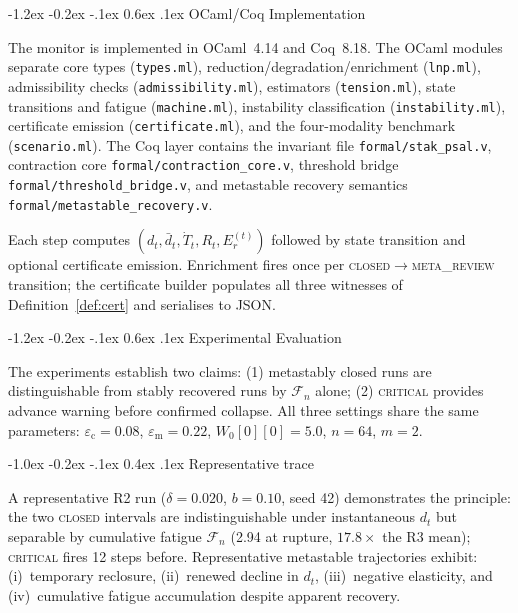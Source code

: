 \documentclass{llncs}
\makeatletter
\renewcommand\section{\@startsection{section}{1}{\z@}%
  {-1.2ex \@plus -0.2ex \@minus -.1ex}%
  {0.6ex \@plus .1ex}%
  {\normalfont\large\bfseries}}
\renewcommand\subsection{\@startsection{subsection}{2}{\z@}%
  {-1.0ex \@plus -0.2ex \@minus -.1ex}%
  {0.4ex \@plus .1ex}%
  {\normalfont\normalsize\bfseries}}
\newcommand{\ecollapse}{\varepsilon_{\mathrm{c}}}
\newcommand{\emeta}{\varepsilon_{\mathrm{m}}}
\newcommand{\st}[1]{\textup{\textsc{#1}}}
\makeatother
\begin{document}
\section{OCaml/Coq Implementation}
\label{sec:impl}

{\sloppy
The monitor is implemented in OCaml~4.14 and Coq~8.18. The OCaml modules separate
core types (\texttt{types.ml}), reduction/degradation/enrichment
(\texttt{lnp.ml}), admissibility checks (\texttt{admissibility.ml}),
estimators (\texttt{tension.ml}), state transitions and fatigue
(\texttt{machine.ml}), instability classification
(\texttt{instability.ml}), certificate emission (\texttt{certificate.ml}),
and the four-modality benchmark (\texttt{scenario.ml}). The Coq layer
contains the invariant file \texttt{formal/stak\_psal.v}, contraction
core \texttt{formal/contraction\_core.v}, threshold bridge
\texttt{formal/threshold\_bridge.v}, and metastable recovery semantics
\texttt{formal/metastable\_recovery.v}.\par}

Each step computes $(d_t,\bar{d}_t,\dot{T}_t,R_t,E_r^{(t)})$ followed
by state transition and optional certificate emission. Enrichment fires
once per \st{closed}$\to$\st{meta\_review} transition; the certificate
builder populates all three witnesses of Definition~\ref{def:cert} and
serialises to JSON.

\section{Experimental Evaluation}
\label{sec:experiments}

The experiments establish two claims: (1) metastably closed runs are
distinguishable from stably recovered runs by $\mathcal{F}_n$ alone;
(2) \st{critical} provides advance warning before confirmed collapse.
All three settings share the same parameters:
$\ecollapse = 0.08$, $\emeta = 0.22$, $W_0[0][0] = 5.0$, $n = 64$,
$m = 2$.

\subsection{Representative trace}
\label{sec:trace}

A representative R2 run ($\delta = 0.020$, $b = 0.10$, seed 42)
demonstrates the principle: the two \st{closed} intervals are
indistinguishable under instantaneous $d_t$ but separable by cumulative
fatigue $\mathcal{F}_n$ (2.94 at rupture, $17.8\times$ the R3 mean);
\st{critical} fires 12 steps before. Representative metastable trajectories exhibit:
(i)~temporary reclosure, (ii)~renewed decline in $d_t$,
(iii)~negative elasticity, and (iv)~cumulative fatigue accumulation
despite apparent recovery.
\end{document}
